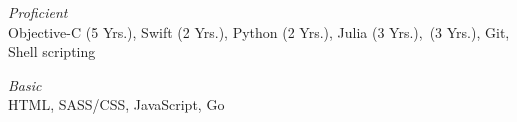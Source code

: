 %
\emph{Proficient}\\
Objective-C (5 Yrs.), Swift (2 Yrs.), Python (2 Yrs.), Julia (3 Yrs.), \ML\,(3
Yrs.), Git, Shell scripting

\medskip

\emph{Basic}\\
HTML, SASS/CSS, JavaScript, Go

\bigskip
